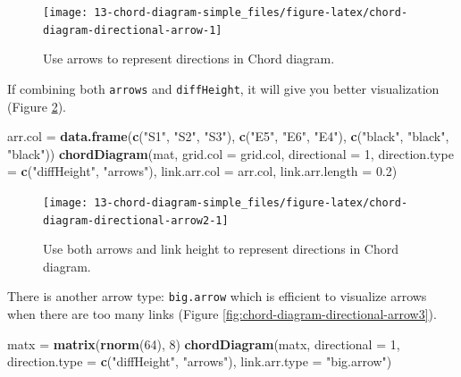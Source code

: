 \documentclass[]{book}
\newenvironment{Shaded}{\begin{snugshade}}{\end{snugshade}}
\newcommand{\KeywordTok}[1]{\textcolor[rgb]{0.13,0.29,0.53}{\textbf{#1}}}
\newcommand{\DataTypeTok}[1]{\textcolor[rgb]{0.13,0.29,0.53}{#1}}
\newcommand{\DecValTok}[1]{\textcolor[rgb]{0.00,0.00,0.81}{#1}}
\newcommand{\FloatTok}[1]{\textcolor[rgb]{0.00,0.00,0.81}{#1}}
\newcommand{\StringTok}[1]{\textcolor[rgb]{0.31,0.60,0.02}{#1}}
\newcommand{\NormalTok}[1]{#1}
\theoremstyle{definition}
\theoremstyle{definition}
\theoremstyle{remark}
\begin{document}
\begin{figure}

{\centering \texttt{[image: 13-chord-diagram-simple\_files/figure-latex/chord-diagram-directional-arrow-1]} 

}

\caption{Use arrows to represent directions in Chord diagram.}\label{fig:chord-diagram-directional-arrow}
\end{figure}

If combining both \texttt{arrows} and \texttt{diffHeight}, it will give
you better visualization (Figure
\ref{fig:chord-diagram-directional-arrow2}).

\begin{Shaded}
\begin{Highlighting}[]
\NormalTok{arr.col =}\StringTok{ }\KeywordTok{data.frame}\NormalTok{(}\KeywordTok{c}\NormalTok{(}\StringTok{"S1"}\NormalTok{, }\StringTok{"S2"}\NormalTok{, }\StringTok{"S3"}\NormalTok{), }\KeywordTok{c}\NormalTok{(}\StringTok{"E5"}\NormalTok{, }\StringTok{"E6"}\NormalTok{, }\StringTok{"E4"}\NormalTok{), }
    \KeywordTok{c}\NormalTok{(}\StringTok{"black"}\NormalTok{, }\StringTok{"black"}\NormalTok{, }\StringTok{"black"}\NormalTok{))}
\KeywordTok{chordDiagram}\NormalTok{(mat, }\DataTypeTok{grid.col =}\NormalTok{ grid.col, }\DataTypeTok{directional =} \DecValTok{1}\NormalTok{, }
    \DataTypeTok{direction.type =} \KeywordTok{c}\NormalTok{(}\StringTok{"diffHeight"}\NormalTok{, }\StringTok{"arrows"}\NormalTok{),}
    \DataTypeTok{link.arr.col =}\NormalTok{ arr.col, }\DataTypeTok{link.arr.length =} \FloatTok{0.2}\NormalTok{)}
\end{Highlighting}
\end{Shaded}

\begin{figure}

{\centering \texttt{[image: 13-chord-diagram-simple\_files/figure-latex/chord-diagram-directional-arrow2-1]} 

}

\caption{Use both arrows and link height to represent directions in Chord diagram.}\label{fig:chord-diagram-directional-arrow2}
\end{figure}

There is another arrow type: \texttt{big.arrow} which is efficient to
visualize arrows when there are too many links (Figure
\ref{fig:chord-diagram-directional-arrow3}).

\begin{Shaded}
\begin{Highlighting}[]
\NormalTok{matx =}\StringTok{ }\KeywordTok{matrix}\NormalTok{(}\KeywordTok{rnorm}\NormalTok{(}\DecValTok{64}\NormalTok{), }\DecValTok{8}\NormalTok{)}
\KeywordTok{chordDiagram}\NormalTok{(matx, }\DataTypeTok{directional =} \DecValTok{1}\NormalTok{, }\DataTypeTok{direction.type =} \KeywordTok{c}\NormalTok{(}\StringTok{"diffHeight"}\NormalTok{, }\StringTok{"arrows"}\NormalTok{),}
    \DataTypeTok{link.arr.type =} \StringTok{"big.arrow"}\NormalTok{)}
\end{Highlighting}
\end{Shaded}
\end{document}
